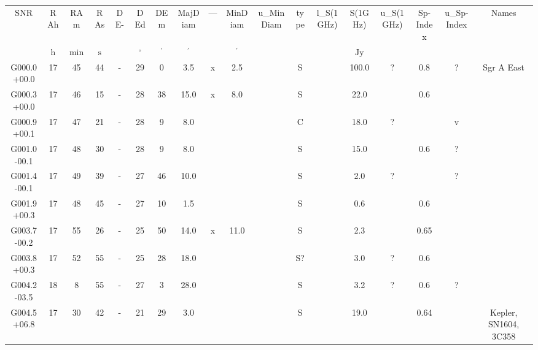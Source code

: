 \begin{table}
\begin{tabular}{cccccccccccccccccc}
SNR & RAh & RAm & RAs & DE- & DEd & DEm & MajDiam & --- & MinDiam & u_MinDiam & type & l_S(1GHz) & S(1GHz) & u_S(1GHz) & Sp-Index & u_Sp-Index & Names \\
 & $\mathrm{h}$ & $\mathrm{min}$ & $\mathrm{s}$ &  & $\mathrm{{}^{\circ}}$ & $\mathrm{{}^{\prime}}$ & $\mathrm{{}^{\prime}}$ &  & $\mathrm{{}^{\prime}}$ &  &  &  & $\mathrm{Jy}$ &  &  &  &  \\
G000.0+00.0 & 17 & 45 & 44 & - & 29 & 0 & 3.5 & x & 2.5 &  & S &  & 100.0 & ? & 0.8 & ? & Sgr A East \\
G000.3+00.0 & 17 & 46 & 15 & - & 28 & 38 & 15.0 & x & 8.0 &  & S &  & 22.0 &  & 0.6 &  &  \\
G000.9+00.1 & 17 & 47 & 21 & - & 28 & 9 & 8.0 &  &  &  & C &  & 18.0 & ? &  & v &  \\
G001.0-00.1 & 17 & 48 & 30 & - & 28 & 9 & 8.0 &  &  &  & S &  & 15.0 &  & 0.6 & ? &  \\
G001.4-00.1 & 17 & 49 & 39 & - & 27 & 46 & 10.0 &  &  &  & S &  & 2.0 & ? &  & ? &  \\
G001.9+00.3 & 17 & 48 & 45 & - & 27 & 10 & 1.5 &  &  &  & S &  & 0.6 &  & 0.6 &  &  \\
G003.7-00.2 & 17 & 55 & 26 & - & 25 & 50 & 14.0 & x & 11.0 &  & S &  & 2.3 &  & 0.65 &  &  \\
G003.8+00.3 & 17 & 52 & 55 & - & 25 & 28 & 18.0 &  &  &  & S? &  & 3.0 & ? & 0.6 &  &  \\
G004.2-03.5 & 18 & 8 & 55 & - & 27 & 3 & 28.0 &  &  &  & S &  & 3.2 & ? & 0.6 & ? &  \\
G004.5+06.8 & 17 & 30 & 42 & - & 21 & 29 & 3.0 &  &  &  & S &  & 19.0 &  & 0.64 &  & Kepler, SN1604, 3C358 \\
\end{tabular}
\end{table}
